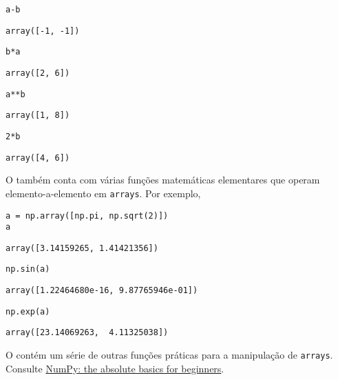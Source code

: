 \begin{lstlisting}
a-b
\end{lstlisting}

\begin{verbatim}
array([-1, -1])
\end{verbatim}

\begin{lstlisting}
b*a
\end{lstlisting}

\begin{verbatim}
array([2, 6])
\end{verbatim}

\begin{lstlisting}
a**b
\end{lstlisting}

\begin{verbatim}
array([1, 8])
\end{verbatim}

\begin{lstlisting}
2*b
\end{lstlisting}

\begin{verbatim}
array([4, 6])
\end{verbatim}


O {\numpy} também conta com várias funções matemáticas elementares que operam elemento-a-elemento em \texttt{arrays}. Por exemplo,

\begin{lstlisting}
a = np.array([np.pi, np.sqrt(2)])
a
\end{lstlisting}

\begin{verbatim}
array([3.14159265, 1.41421356])
\end{verbatim}

\begin{lstlisting}
np.sin(a)
\end{lstlisting}

\begin{verbatim}
array([1.22464680e-16, 9.87765946e-01])
\end{verbatim}

\begin{lstlisting}
np.exp(a)
\end{lstlisting}

\begin{verbatim}
array([23.14069263,  4.11325038])
\end{verbatim}

 
\begin{obs}
O {\numpy} contém um série de outras funções práticas para a manipulação de \texttt{arrays}. Consulte \href{https://numpy.org/doc/stable/user/absolute_beginners.html\#numpy-the-absolute-basics-for-beginners}{NumPy: the absolute basics for beginners}.  
\end{obs}

